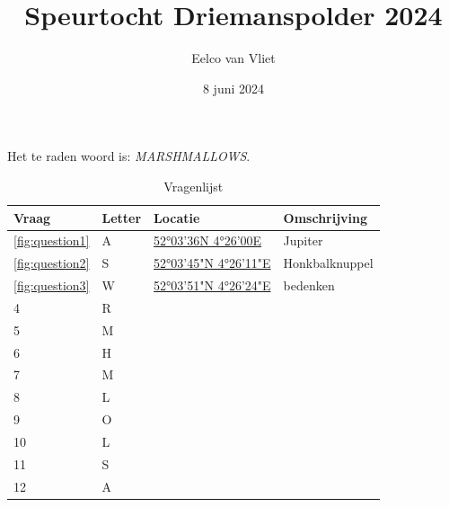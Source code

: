 \documentclass{article}
\title{Speurtocht Driemanspolder 2024}
\author{Eelco van Vliet}
\date{8 juni 2024}
\begin{document}
    \maketitle

    Het te raden woord is: \emph{MARSHMALLOWS}.

    \begin{table}
        \caption{Vragenlijst}
        \begin{tabular}{llll}
            \toprule
            \textbf{Vraag} & \textbf{Letter} & \textbf{Locatie} & \textbf{Omschrijving} \\
            \midrule
            \ref{fig:question1} & A &
            \href{https://forms.gle/rMDZizPGtA1BNkm46}{52°03'36N 4°26'00E} & Jupiter\\
            \ref{fig:question2} & S &
            \href{https://forms.gle/jwE6WMcVdYzMEdi86}{52°03'45"N 4°26'11"E} & Honkbalknuppel\\
            \ref{fig:question3} & W &
            \href{https://forms.gle/jwE6WMcVdYzMEdi86}{52°03'51"N 4°26'24"E} & bedenken \\
            4                    & R               &                  &                       \\
            5                    & M               &                  &                       \\
            6                    & H               &                  &                       \\
            7                    & M               &                  &                       \\
            8                    & L               &                  &                       \\
            9                    & O               &                  &                       \\
            10                   & L               &                  &                       \\
            11                   & S               &                  &                       \\
            12                   & A               &                  &                       \\
            \bottomrule
        \end{tabular}\label{tab:table}
    \end{table}
\end{document}
